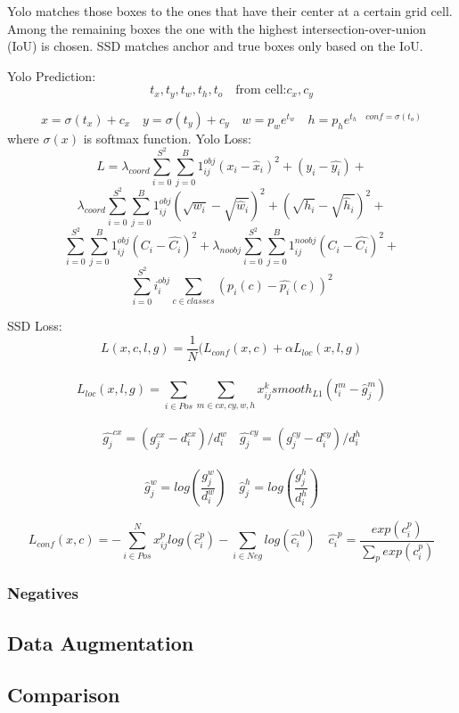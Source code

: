 	Yolo matches those boxes to the ones that have their center at a certain grid cell. Among the remaining boxes the one with the highest intersection-over-union (IoU) is chosen. SSD matches anchor and true boxes only based on the IoU.
	
	Yolo Prediction:
	$$t_x,t_y,t_w,t_h,t_o \quad \text{from cell:} c_x, c_y$$
	
	$$x = \sigma(t_x) + c_x \quad y = \sigma(t_y) + c_y \quad w = p_w e^{t_w} \quad h = p_he^{t_h \quad conf = \sigma(t_o)}$$
	where $\sigma(x)$ is softmax function.
	Yolo Loss:\\
	$$ L = \lambda_{coord} \sum_{i=0}^{S^2}\sum_{j=0}^{B} 1^{obj}_{ij}(x_i - \hat{x}_i)^2 + (y_i - \hat{y_i})+$$
	$$
	\lambda_{coord} \sum_{i=0}^{S^2}\sum_{j=0}^{B} 1^{obj}_{ij}(\sqrt{w_i} - \sqrt{\hat{w}_i})^2 + (\sqrt{h_i} - \sqrt{\hat{h}_i})^2 +$$ 
	$$\sum_{i=0}^{S^2}\sum_{j=0}^{B} 1^{obj}_{ij} (C_i - \hat{C_i})^2
	+ 
	\lambda_{noobj} \sum_{i=0}^{S^2}\sum_{j=0}^{B} 1^{noobj}_{ij} (C_i - \hat{C_i})^2
	+ $$$$
	\sum_{i=0}^{S^2}i_i^{obj} \sum_{c \in classes}(p_i(c) - \hat{p_i}(c))^2$$
	
	SSD Loss:\\
	$$L(x,c,l,g) = \frac{1}{N} (L_{conf}(x,c) +\alpha L_{loc}(x,l,g)$$\\
	$$L_{loc}(x,l,g) = \sum_{i \in Pos}\sum_{m \in {cx,cy,w,h}} x_{ij}^k smooth_{L1} (l_i^m - \hat{g}^m_j)$$\\
	$$\hat{g_j}^{cx} = (g_j^{cx} - d_i^{cx})/d_i^{w} \quad \hat{g_j}^{cy} = (g_j^{cy} - d_i^{cy})/d_i^{h}$$\\
	$$\hat{g}_j^w = log(\frac{g_j^w}{d_i^w}) \quad \hat{g}_j^h = log(\frac{g_j^h}{d_i^h})$$
	
	$$L_{conf}(x,c) = - \sum_{i \in Pos}^{N} x_{ij}^p log(\hat{c}_i^p) - \sum_{i \in Neg} log(\hat{c_i}^0) \quad \hat{c_i}^p = \frac{exp(c_i^p)}{\sum_{p} exp(c_i^p)}$$
	\subsubsection{Negatives}
	
	\subsection{Data Augmentation}
	
	\subsection{Comparison}
